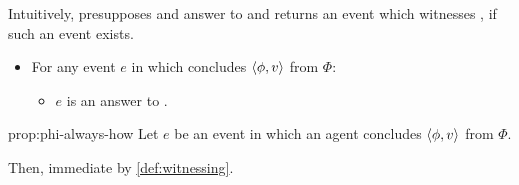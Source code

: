 \begin{note}
  Intuitively, \qHowV{} presupposes and answer to \qWhyV{} and returns an event which witnesses \ros{}, if such an event exists.
\end{note}

\begin{note}
  \begin{proposition}
    \label{prop:phi-always-how}

    \begin{itemize}
    \item
      For any event \(e\) in which \vAgent{} concludes \(\langle \phi, v \rangle\) from \(\Phi\):
      \begin{itemize}
      \item
        \(e\) is an answer to \qHowV{}.
      \end{itemize}
    \end{itemize}
    \vspace{-\baselineskip}
  \end{proposition}

  \begin{argument}{prop:phi-always-how}
    Let \(e\) be an event in which an agent concludes \(\langle \phi, v \rangle\) from \(\Phi\).

    Then, immediate by \autoref{def:witnessing}.
  \end{argument}





\end{note}

